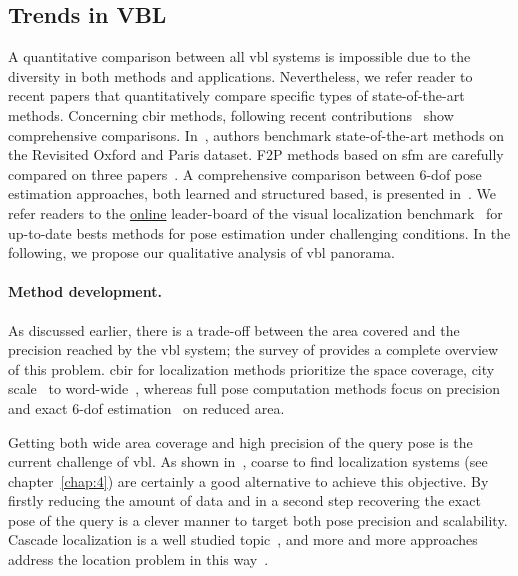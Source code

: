 	\subsection{Trends in VBL}
		\label{subsec:qualitative_comparison}
    	
		A quantitative comparison between all \ac{vbl} systems is impossible due to the diversity in both methods and applications. Nevertheless, we refer reader to recent papers that quantitatively compare specific types of state-of-the-art methods. Concerning \ac{cbir} methods, following recent contributions~\citep{Radenovic2016,Gordo2016} show comprehensive comparisons. In~\citep{Radenovic2018}, authors benchmark state-of-the-art methods on the Revisited Oxford and Paris dataset. F2P methods based on \ac{sfm} are carefully compared on three papers~\citep{Feng2016a,Sattler2016a,Svarm2016}. A comprehensive comparison between 6-\ac{dof} pose estimation approaches, both learned and structured based, is presented in~\citep{Sattler2019}. We refer readers to the \href{https://www.visuallocalization.net/benchmark/}{online} leader-board of the visual localization benchmark~\citep{Sattler2018} for up-to-date bests methods for pose estimation under challenging conditions. In the following, we propose our qualitative analysis of \ac{vbl} panorama. 
        

        \paragraph{Method development.}
        	As discussed earlier, there is a trade-off between the area covered and the precision reached by the \ac{vbl} system; the survey of \citet{Brejcha2017} provides a complete overview of this problem. \ac{cbir} for localization methods prioritize the space coverage, city scale~\citep{Gordo2016} to word-wide~\citep{Vo2017}, whereas full pose computation methods focus on precision and exact 6-\ac{dof} estimation~\citep{Feng2016a} on reduced area. 

	        Getting both wide area coverage and high precision of the query pose is the current challenge of \ac{vbl}. As shown in~\citep{Sattler2017}, coarse to find localization systems (see chapter~\ref{chap:4}) are certainly a good alternative to achieve this objective. By firstly reducing the amount of data and in a second step recovering the exact pose of the query is a clever manner to target both pose precision and scalability. Cascade localization is a well studied topic~\citep{Rubio2015,Azzi2016,Song2016,Meng2016,Sattler2017}, and more and more approaches address the location problem in this way~\citep{Sarlin2018a,Sarlin2018,Germain2019}.
     
